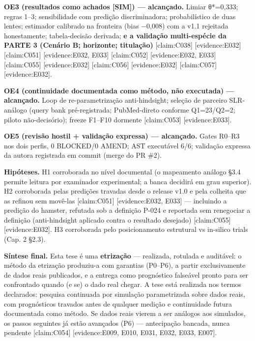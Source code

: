 \documentclass[
  12pt,
]{report}
\begin{document}
\textbf{OE3 (resultados como achados {[}SIM{]}) --- alcançado.} Limiar
θ*=0,333; regras 1--3; sensibilidade com predição discriminadora;
probabilístico de duas lentes; estimador calibrado na fronteira (bias
−0,008) com a v1.1 rejeitada honestamente; tabela-decisão derivada;
\textbf{e a validação multi-espécie da PARTE 3 (Cenário B; horizonte;
titulação)} {[}claim:C038{]} {[}evidence:E032{]} {[}claim:C051{]}
{[}evidence:E032, E033{]} {[}claim:C052{]} {[}evidence:E032, E033{]}
{[}claim:C055{]} {[}evidence:E032{]} {[}claim:C056{]}
{[}evidence:E032{]} {[}claim:C057{]} {[}evidence:E032{]}.

\textbf{OE4 (continuidade documentada como método, não executada) ---
alcançado.} Loop de re-parametrização anti-hindsight; seleção de
parceiro SLR-análogo (query bank pré-registrada; PubMed-direto conforme
Q1=23/Q2=2; piloto não-decisório); freeze F1--F10 dormente
{[}claim:C053{]} {[}evidence:E033{]}.

\textbf{OE5 (revisão hostil + validação expressa) --- alcançado.} Gates
R0--R3 nos dois perfis, 0 BLOCKED/0 AMEND; AST executável 6/6; validação
expressa da autora registrada em commit (merge do PR \#2).

\textbf{Hipóteses.} H1 corroborada no nível documental (o mapeamento
análogo §3.4 permite leitura por examinador experimental; a banca
decidirá em grau superior). H2 corroborada pelas predições travadas
desde o release v1.0 e pela colheita que as refinou sem movê-las
{[}claim:C051{]} {[}evidence:E032, E033{]} --- incluindo a predição do
hamster, refutada sob a definição P-024 e reportada sem renegociar a
definição (anti-hindsight aplicado contra o resultado desejado)
{[}claim:C055{]} {[}evidence:E032{]}. H3 corroborada pelo posicionamento
estrutural vs in-silico trials (Cap. 2 §2.3).

\textbf{Síntese final.} Esta tese é uma \textbf{etrização} ---
realizada, rotulada e auditável: o método da etrização produziu-a com
garantias (P0--P6), a partir exclusivamente de dados reais publicados, e
a entrega como prognóstico falseável pronto para ser confrontado quando
(e se) o dado real chegar. A tese está realizada nos termos declarados:
pesquisa continuada por simulação parametrizada sobre dados reais, com
prognósticos travados antes de qualquer medição e continuidade futura
documentada como método. Se dados reais vierem a ser análogos aos
simulados, os passos seguintes já estão avançados (P6) --- antecipação
bancada, nunca pendente {[}claim:C054{]} {[}evidence:E009, E010, E031,
E032, E033, E007{]}.
\end{document}
